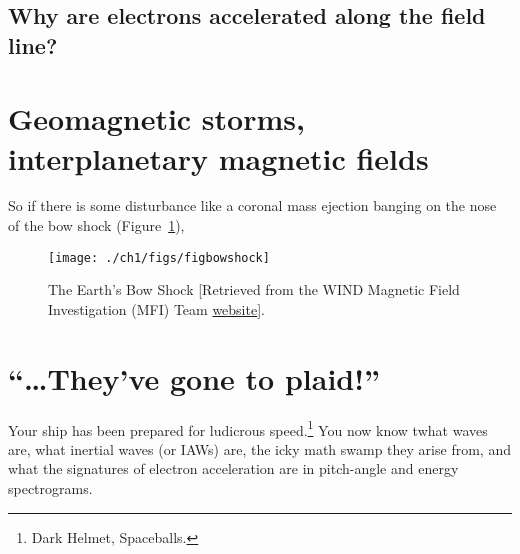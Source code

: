 \subsection{Why are electrons accelerated along the field line?}



\section{Geomagnetic storms, interplanetary magnetic fields}

So if there is some disturbance like a coronal mass ejection banging
on the nose of the bow shock (Figure~\ref{ch1:FigBowShock}),


\begin{figure}
  \centering
  \noindent\texttt{[image: ./ch1/figs/figbowshock]}
  \caption[The Earth's Bow Shock]{The Earth's Bow Shock [Retrieved
    from the WIND Magnetic Field Investigation (MFI) Team
    \href{https://wind.nasa.gov/mfi/team_sciencea.html}{website}].}
  \label{ch1:FigBowShock}
\end{figure}









\section{``\dots They've gone to plaid!''}

Your ship has been prepared for ludicrous speed.\footnote{Dark Helmet,
  Spaceballs.} You now know twhat \Alf waves are, what inertial \Alf waves (or
IAWs) are, the icky math swamp they arise from, and what the signatures of
\Alfic electron acceleration are in pitch-angle and energy spectrograms. 

